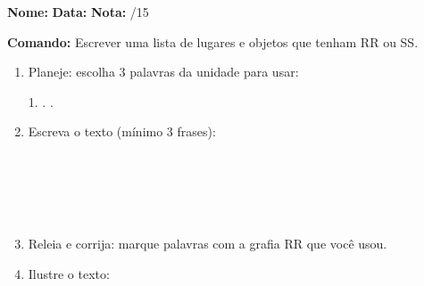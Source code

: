 \begin{exercicio}

\noindent\textbf{Nome:} \underline{\hspace{3.2cm}} \quad \textbf{Data:} \underline{\hspace{1.6cm}} \quad \textbf{Nota:} \underline{\hspace{0.9cm}}/15


\noindent\textbf{Comando:} Escrever uma lista de lugares e objetos que tenham RR ou SS.


\begin{enumerate}

  \item Planeje: escolha 3 palavras da unidade para usar:
  \begin{center}
  1. \underline{\hspace{3cm}} . \underline{\hspace{3cm}} . \underline{\hspace{3cm}}
  \end{center}

  \item Escreva o texto (mínimo 3 frases):
  \begin{center}
  \underline{\hspace{12cm}}\\\underline{\hspace{12cm}}\\\underline{\hspace{12cm}}\\\underline{\hspace{12cm}}\\\underline{\hspace{12cm}}
  \end{center}

  \item Releia e corrija: marque palavras com a grafia RR que você usou.

  \item Ilustre o texto:
  \begin{center}
  \end{center}

\end{enumerate}

\end{exercicio}

